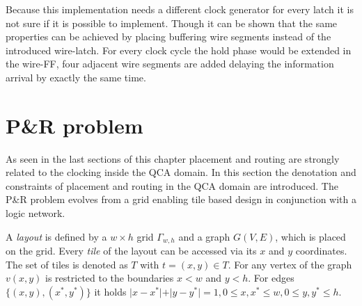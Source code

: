 Because this implementation needs a different clock generator for every latch it is not sure if it is possible to implement. Though it can be shown that the same properties can be achieved by placing buffering wire segments instead of the introduced wire-latch. For every clock cycle the hold phase would be extended in the wire-FF, four adjacent wire segments are added delaying the information arrival by exactly the same time.


\section{P\&R problem} \label{sec:PR}

As seen in the last sections of this chapter placement and routing are strongly related to the clocking inside the QCA domain. In this section the denotation and constraints of placement and routing in the QCA domain are introduced. The P\&R problem evolves from a grid enabling tile based design in conjunction with a logic network.

\begin{definition}
	A \textit{layout} is defined by a $w \times h$ grid $\Gamma_{w, h}$ and a graph $G(V, E)$, which is placed on the grid. Every \textit{tile} of the layout can be accessed via its $x$ and $y$ coordinates. The set of tiles is denoted as $T$ with $t = (x, y) \in T$. For any vertex of the graph $v(x, y)$ is restricted to the boundaries $x < w$ and $y < h$. For edges $\{(x, y), (x^*, y^*)\}$ it holds $\vert x-x^*\vert+\vert y-y^*\vert = 1, 0 \leq x, x^* \leq w, 0 \leq y, y^* \leq h$.
\end{definition}

